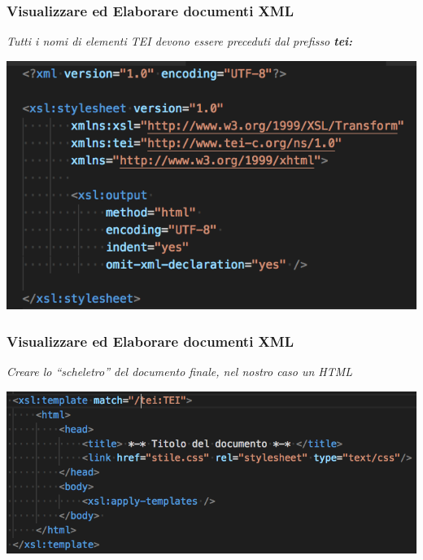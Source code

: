 \begin{frame}
    \frametitle{Visualizzare ed Elaborare documenti XML}
    \addtocounter{nframe}{1}
    
        \textit{Tutti i nomi di elementi TEI devono essere preceduti dal
        prefisso \textbf{tei:}}

    \begin{center}
        \includegraphics[width=.9\textwidth]{imgs/EsempioCommentato1.png}
    \end{center}

\end{frame}


\begin{frame}
    \frametitle{Visualizzare ed Elaborare documenti XML}
    \addtocounter{nframe}{1}
    
        \textit{Creare lo “scheletro” del documento finale, nel nostro caso un HTML}

    \begin{center}
        \includegraphics[width=.95\textwidth]{imgs/EsempioCommentato2.png}
    \end{center}

\end{frame}

